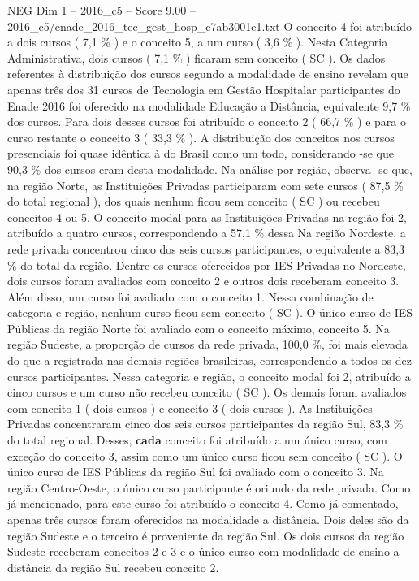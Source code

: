 \begin{textsample}{NEG Dim 1 – 2016\_c5 – Score 9.00 – 2016\_c5/enade\_2016\_tec\_gest\_hosp\_c7ab3001e1.txt}
O conceito 4 foi atribuído a dois cursos ( 7,1 \% ) e o conceito 5, a um curso ( 3,6 \% ).
Nesta Categoria Administrativa, dois cursos ( 7,1 \% ) ficaram sem conceito ( SC ).
Os dados referentes à distribuição dos cursos segundo a modalidade de ensino revelam que apenas três dos 31 cursos de Tecnologia em Gestão Hospitalar participantes do Enade 2016 foi oferecido na modalidade Educação a Distância, equivalente 9,7 \% dos cursos.
Para dois desses cursos foi atribuído o conceito 2 ( 66,7 \% ) e para o curso restante o conceito 3 ( 33,3 \% ).
A distribuição dos conceitos nos cursos presenciais foi quase idêntica à do Brasil como um todo, considerando -se que 90,3 \% dos cursos eram desta modalidade.
Na análise por região, observa -se que, na região Norte, as Instituições Privadas participaram com sete cursos ( 87,5 \% do total regional ), dos quais nenhum ficou sem conceito ( SC ) ou recebeu conceitos 4 ou 5.
O conceito modal para as Instituições Privadas na região foi 2, atribuído a quatro cursos, correspondendo a 57,1 \% dessa Na região Nordeste, a rede privada concentrou cinco dos seis cursos participantes, o equivalente a 83,3 \% do total da região.
Dentre os cursos oferecidos por IES Privadas no Nordeste, dois cursos foram avaliados com conceito 2 e outros dois receberam conceito 3.
Além disso, um curso foi avaliado com o conceito 1.
Nessa combinação de categoria e região, nenhum curso ficou sem conceito ( SC ).
O único curso de IES Públicas da região Norte foi avaliado com o conceito máximo, conceito 5.
Na região Sudeste, a proporção de cursos da rede privada, 100,0 \%, foi mais elevada do que a registrada nas demais regiões brasileiras, correspondendo a todos os dez cursos participantes.
Nessa categoria e região, o conceito modal foi 2, atribuído a cinco cursos e um curso não recebeu conceito ( SC ).
Os demais foram avaliados com conceito 1 ( dois cursos ) e conceito 3 ( dois cursos ).
As Instituições Privadas concentraram cinco dos seis cursos participantes da região Sul, 83,3 \% do total regional.
Desses, \textbf{cada} conceito foi atribuído a um único curso, com exceção do conceito 3, assim como um único curso ficou sem conceito ( SC ).
O único curso de IES Públicas da região Sul foi avaliado com o conceito 3.
Na região Centro-Oeste, o único curso participante é oriundo da rede privada.
Como já mencionado, para este curso foi atribuído o conceito 4.
Como já comentado, apenas três cursos foram oferecidos na modalidade a distância.
Dois deles são da região Sudeste e o terceiro é proveniente da região Sul.
Os dois cursos da região Sudeste receberam conceitos 2 e 3 e o único curso com modalidade de ensino a distância da região Sul recebeu conceito 2.

\end{textsample}
